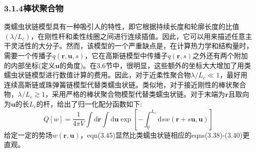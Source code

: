 \subsubsection{3.1.4棒状聚合物}
类蠕虫状链模型具有一种吸引人的特性，即它根据持续长度和轮廓长度的比值$(\lambda/L_c)$，在刚性杆和柔性线圈之间进行连续插值。因此，它可以用来描述任意主干灵活性的大分子。然而，该模型的一个严重缺点是，在计算热力学和结构量时，需要一个传播子$q(\mathbf{r},\mathbf{u},s)$，它在高斯链模型中传播子$q(\mathbf{r},s)$之外还有两个附加的内部坐标(定义$\mathbf{u}$的角度)。在3.6节中，很明显，这些额外的坐标大大增加了用类蠕虫状链模型进行数值计算的费用。因此，对于近柔性聚合物$\lambda/L_c\ll 1$，最好用连续高斯链或珠弹簧链模型代替类蠕虫状链。类似地，对于接近刚性的棒状聚合物，$\lambda/L_c\gtrsim 1$，采用严格的棒状聚合物模型代替类蠕虫状链。对于末端为$\mathbf{r}$且取向为$\mathbf{u}$的长$L_c$的杆，给出了归一化配分函数如下:
\begin{equation}
Q[w]=\frac{1}{4\pi V}\int\mathrm{d}\mathbf{r}\int\mathrm{d}\mathbf{u}\exp\left[-\int_0^{L_c}\mathrm{d}sw(\mathbf{r}+s\mathbf{u},\mathbf{u})\right]
\end{equation}
给定一定的势场$w(\mathbf{r},\mathbf{u})$，eqn(3.45)显然比类蠕虫状链相应的eqns(3.38)-(3.40)更直观。










































































































